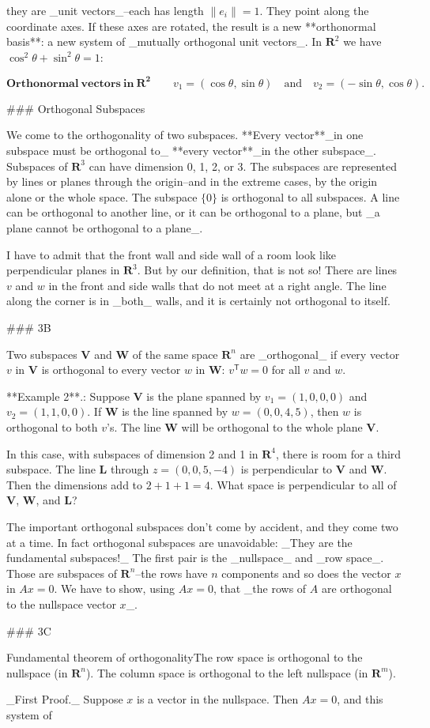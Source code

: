 they are _unit vectors_--each has length \(\|e_{i}\|=1\). They point along the coordinate axes. If these axes are rotated, the result is a new **orthonormal basis**: a new system of _mutually orthogonal unit vectors_. In \(\mathbf{R}^{2}\) we have \(\cos^{2}\theta+\sin^{2}\theta=1\):

\[\mathbf{Orthonormal\ vectors\ in\ \mathbf{R}^{2}}\qquad v_{1}=(\cos\theta,\sin \theta)\quad\text{and}\quad v_{2}=(-\sin\theta,\cos\theta).\]

### Orthogonal Subspaces

We come to the orthogonality of two subspaces. **Every vector**_in one subspace must be orthogonal to_ **every vector**_in the other subspace_. Subspaces of \(\mathbf{R}^{3}\) can have dimension 0, 1, 2, or 3. The subspaces are represented by lines or planes through the origin--and in the extreme cases, by the origin alone or the whole space. The subspace \(\{0\}\) is orthogonal to all subspaces. A line can be orthogonal to another line, or it can be orthogonal to a plane, but _a plane cannot be orthogonal to a plane_.

I have to admit that the front wall and side wall of a room look like perpendicular planes in \(\mathbf{R}^{3}\). But by our definition, that is not so! There are lines \(v\) and \(w\) in the front and side walls that do not meet at a right angle. The line along the corner is in _both_ walls, and it is certainly not orthogonal to itself.

### 3B

Two subspaces \(\mathbf{V}\) and \(\mathbf{W}\) of the same space \(\mathbf{R}^{n}\) are _orthogonal_ if every vector \(v\) in \(\mathbf{V}\) is orthogonal to every vector \(w\) in \(\mathbf{W}\): \(v^{\mathsf{T}}w=0\) for all \(v\) and \(w\).

**Example 2**.: Suppose \(\mathbf{V}\) is the plane spanned by \(v_{1}=(1,0,0,0)\) and \(v_{2}=(1,1,0,0)\). If \(\mathbf{W}\) is the line spanned by \(w=(0,0,4,5)\), then \(w\) is orthogonal to both \(v\)'s. The line \(\mathbf{W}\) will be orthogonal to the whole plane \(\mathbf{V}\).

In this case, with subspaces of dimension 2 and 1 in \(\mathbf{R}^{4}\), there is room for a third subspace. The line \(\mathbf{L}\) through \(z=(0,0,5,-4)\) is perpendicular to \(\mathbf{V}\) and \(\mathbf{W}\). Then the dimensions add to \(2+1+1=4\). What space is perpendicular to all of \(\mathbf{V}\), \(\mathbf{W}\), and \(\mathbf{L}\)?

The important orthogonal subspaces don't come by accident, and they come two at a time. In fact orthogonal subspaces are unavoidable: _They are the fundamental subspaces!_ The first pair is the _nullspace_ and _row space_. Those are subspaces of \(\mathbf{R}^{n}\)--the rows have \(n\) components and so does the vector \(x\) in \(Ax=0\). We have to show, using \(Ax=0\), that _the rows of \(A\) are orthogonal to the nullspace vector \(x\)_.

### 3C

Fundamental theorem of orthogonalityThe row space is orthogonal to the nullspace (in \(\mathbf{R}^{n}\)). The column space is orthogonal to the left nullspace (in \(\mathbf{R}^{m}\)).

_First Proof._ Suppose \(x\) is a vector in the nullspace. Then \(Ax=0\), and this system of 